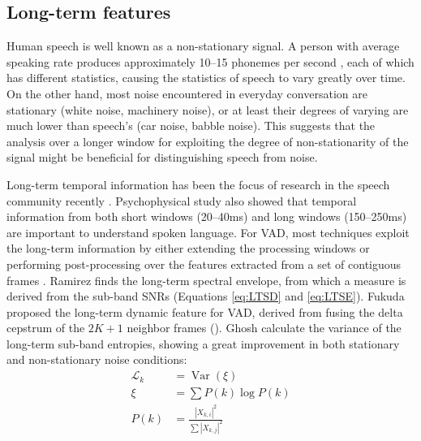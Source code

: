 

\subsection{Long-term features}



Human speech is well known as a non-stationary signal.
A person with average speaking rate produces approximately 10--15 phonemes per second \cite{liberman1996speech}, each of which has different statistics, causing the statistics of speech to vary greatly over time.
On the other hand, most noise encountered in everyday conversation are stationary (white noise, machinery noise), or at least their degrees of varying are much lower than speech's (car noise, babble noise).
This suggests that the analysis over a longer window for exploiting the degree of non-stationarity of the signal might be beneficial for distinguishing speech from noise.

Long-term temporal information has been the focus of research in the speech community recently \cite{chen2004learning,fukuda2008short,hermansky1999temporal}.
Psychophysical study \cite{poeppel2003analysis} also showed that temporal information from both short windows (20--40ms) and long windows (150--250ms) are important to understand spoken language.
For VAD, most techniques exploit the long-term information by either extending the processing windows \cite{ramirez2004efficient} or performing post-processing over the features extracted from a set of contiguous frames \cite{fukuda2008phone,ghosh2011robust}.
Ramirez \etal \cite{ramirez2004efficient} finds the long-term spectral envelope, from which a measure is derived from the sub-band SNRs (Equations \ref{eq:LTSD} and \ref{eq:LTSE}).
Fukuda \etal \cite{fukuda2008phone,fukuda2008short,fukuda2010long} proposed the long-term dynamic feature for VAD, derived from fusing the delta cepstrum of the $2K+1$ neighbor frames ().
Ghosh \etal \cite{ghosh2011robust} calculate the variance of the long-term sub-band entropies, showing a great improvement in both stationary and non-stationary noise conditions:
\begin{align}
    \mathcal{L}_k &= \operatorname*{Var}(\xi)         \\
    \xi &= \sum P(k) \log P(k)                      \\
    P(k) &= \frac{|X_{k,i}|^2}{\sum |X_{k,j}|^2}
\end{align}

